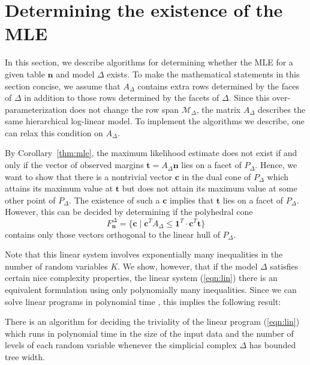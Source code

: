 \documentclass{elsart}
\newcommand{\nn}{\mathbf{n}}
\newcommand{\ttt}{\mathbf{t}}
\begin{document}
\section{Determining the existence of the MLE}\label{sec:exist}

In this section, we describe algorithms for determining whether the
MLE for a given table $\mathbf{n}$ and model $\Delta$ exists.
To make the mathematical statements in this section
concise, we assume that 
$A_\Delta$ contains extra rows determined by the faces
of $\Delta$ in addition to those rows determined by the facets of
$\Delta$.  Since this over-parameterization does not change the row
span $\mathcal{M}_\Delta$, the matrix $A_\Delta$ describes the same
hierarchical log-linear model.  To implement the algorithms
we describe, one can relax this condition on $A_\Delta$.

By Corollary~\ref{thm:mle}, the maximum likelihood estimate
does not exist if and only if the vector of observed margins $\ttt=A_\Delta \nn$
lies on a facet of $P_\Delta$. 
Hence, we want to
show that there is a nontrivial vector $\mathbf{c}$ in the dual cone
of $P_\Delta$ which attains its maximum value at $\ttt$ but does not
attain its maximum value at some other point of $P_\Delta$.  The
existence of such a $\mathbf{c}$ implies that $\ttt$ lies on a facet of
$P_\Delta$.  However, this can be decided by determining if the
polyhedral cone 
\begin{equation}\label{eqn:lin} 
F^\Delta_\nn = \{ \mathbf{c} \mid \mathbf{c}^T A_\Delta \leq
\mathbf{1}^T \cdot \mathbf{c}^T \ttt\}
\end{equation}
contains only those vectors orthogonal to
the linear hull of $P_\Delta$.

Note that this linear system involves exponentially many inequalities
in the number of random variables $K$.  We show, however, that if
the model $\Delta$ satisfies certain nice complexity properties, the
linear system (\ref{eqn:lin}) there is an equivalent
formulation  using only
polynomially many inequalities.  Since we can solve linear programs 
in polynomial time 
\citep[e.g.,][]{SCH98}, this implies the following result:

\begin{thm} \label{thm:treewidth}
There is an algorithm for deciding the triviality of the linear
program (\ref{eqn:lin})  which runs in polynomial time in the size of
the input data and 
the number of levels of each random variable whenever the simplicial
complex $\Delta$ has bounded tree width.
\end{thm}
\end{document}
